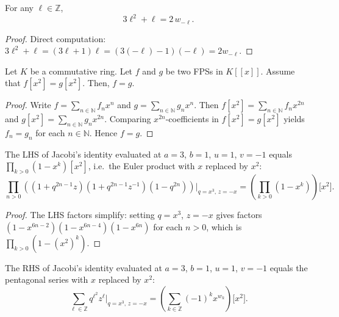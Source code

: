 \begin{lemma}
\label{lem.jtp.pentagonal-exponent-identity}
\leanhelper
\leanok
For any $\ell\in\mathbb{Z}$,
\[
3\ell^{2}+\ell = 2\,w_{-\ell}.
\]
\end{lemma}

\begin{proof}
\leanok
Direct computation: $3\ell^{2}+\ell = (3\ell+1)\ell = (3(-\ell)-1)(-\ell) = 2w_{-\ell}$.
\end{proof}

\begin{lemma}
\label{lem.fps.fxx=gxx}
\leantarget
\leanok
Let $K$ be a commutative ring. Let $f$ and $g$ be two
FPSs in $K[[x]]$. Assume that $f[x^{2}]=g[x^{2}]$.
Then, $f=g$.
\end{lemma}

\begin{proof}
\leanok
Write $f=\sum_{n\in\mathbb{N}}f_{n}x^{n}$ and
$g=\sum_{n\in\mathbb{N}}g_{n}x^{n}$. Then
$f[x^{2}]=\sum_{n\in\mathbb{N}}f_{n}x^{2n}$ and
$g[x^{2}]=\sum_{n\in\mathbb{N}}g_{n}x^{2n}$. Comparing
$x^{2n}$-coefficients in $f[x^{2}]=g[x^{2}]$ yields $f_{n}=g_{n}$
for each $n\in\mathbb{N}$. Hence $f=g$.
\end{proof}

\begin{lemma}
\label{lem.jtp.jacobiLHS-eq-eulerProduct-sq}
\leanhelper
\leanok
The LHS of Jacobi's identity evaluated at $a=3$, $b=1$, $u=1$, $v=-1$
equals $\prod_{k>0}(1-x^{k})[x^{2}]$, i.e.\ the Euler product with
$x$ replaced by $x^{2}$:
\[
\prod_{n>0}\left((1+q^{2n-1}z)(1+q^{2n-1}z^{-1})(1-q^{2n})\right)\Big|_{q=x^3,\,z=-x}
= \left(\prod_{k>0}(1-x^{k})\right)\!\big[x^{2}\big].
\]
\end{lemma}

\begin{proof}
The LHS factors simplify: setting $q=x^{3}$, $z=-x$ gives factors
$(1-x^{6n-2})(1-x^{6n-4})(1-x^{6n})$ for each $n>0$, which is
$\prod_{k>0}(1-(x^{2})^{k})$.
\end{proof}

\begin{lemma}
\label{lem.jtp.jacobiRHS-eq-pentagonalSeries-sq}
\leanhelper
\leanok
The RHS of Jacobi's identity evaluated at $a=3$, $b=1$, $u=1$, $v=-1$
equals the pentagonal series with $x$ replaced by $x^{2}$:
\[
\sum_{\ell\in\mathbb{Z}}q^{\ell^2}z^{\ell}\Big|_{q=x^3,\,z=-x}
= \left(\sum_{k\in\mathbb{Z}}(-1)^k x^{w_k}\right)\!\big[x^{2}\big].
\]
\end{lemma}

